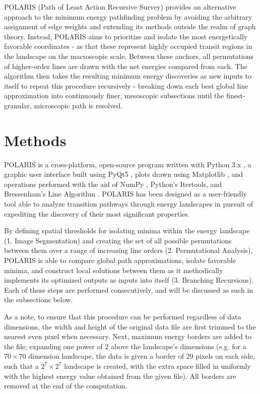 \documentclass[twocolumn]{biophys-new}
\begin{document}
POLARIS (Path of Least Action Recursive Survey) provides an alternative approach to the minimum energy pathfinding problem by avoiding the arbitrary assignment of edge weights and extending its methods outside the realm of graph theory. Instead, POLARIS aims to prioritize and isolate the most energetically favorable coordinates - as that these represent highly occupied transit regions in the landscape on the macroscopic scale. Between these anchors, all permutations of higher-order lines are drawn with the net energies compared from each. The algorithm then takes the resulting minimum energy discoveries as new inputs to itself to repeat this procedure recursively - breaking down each best global line approximation into continuously finer, mesoscopic subsections until the finest-granular, microscopic path is resolved.

\section*{Methods}

POLARIS is a cross-platform, open-source program written with Python 3.x \cite{python}, a graphic user interface built using PyQt5 \cite{pyqt}, plots drawn using Matplotlib \cite{matplotlib}, and operations performed with the aid of NumPy \cite{numpy}, Python's Itertools, and Bressenham's Line Algorithm \cite{bressenham}. POLARIS has been designed as a user-friendly tool able to analyze transition pathways through energy landscapes in pursuit of expediting the discovery of their most significant properties.

By defining spatial thresholds for isolating minima within the energy landscape (1. Image Segmentation) and creating the set of all possible permutations between them over a range of increasing line orders (2. Permutational Analysis), POLARIS is able to compare global path approximations, isolate favorable minima, and construct local solutions between them as it methodically implements its optimized outputs as inputs into itself (3. Branching Recursions). Each of these steps are performed consecutively, and will be discussed as such in the subsections below.

As a note, to ensure that this procedure can be performed regardless of data dimensions, the width and height of the original data file are first trimmed to the nearest even pixel when necessary. Next, maximum energy borders are added to the file; expanding one power of 2 above the landscape's dimensions (e.g. for a $70{\times}70$ dimension landscape, the data is given a border of 29 pixels on each side, such that a $2^{7}{\times}2^{7}$ landscape is created, with the extra space filled in uniformly with the highest energy value obtained from the given file). All borders are removed at the end of the computation. 
\end{document}
